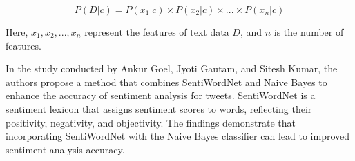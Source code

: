 \documentclass[a4paper]{article}
\begin{document}
$$P(D|c)=P(x_1|c) \times P(x_2|c) \times ... \times P(x_n|c)$$

Here, $x_1, x_2, ..., x_n$ represent the features of text data $D$, and $n$ is the number of features.\cite{ref_nbc1}

In the study conducted by Ankur Goel, Jyoti Gautam, and Sitesh Kumar\cite{ref_nbc2}, the authors propose a method that combines SentiWordNet and Naive Bayes to enhance the accuracy of sentiment analysis for tweets. SentiWordNet is a sentiment lexicon that assigns sentiment scores to words, reflecting their positivity, negativity, and objectivity. The findings demonstrate that incorporating SentiWordNet with the Naive Bayes classifier can lead to improved sentiment analysis accuracy.

% 
\end{document}
